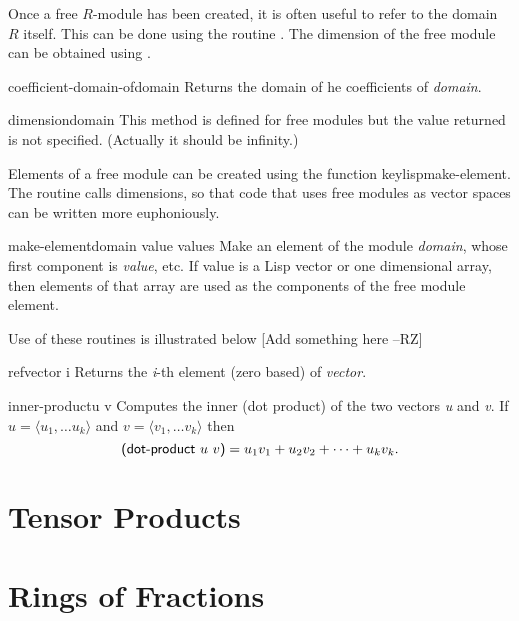 Once a free $R$-module has been created, it is often useful to refer
to the domain $R$ itself. This can be done using the routine
. The dimension of the free module can be
obtained using .
  
\begin{functiondef}{coefficient-domain-of}{domain}
Returns the domain of he coefficients of {\em domain}.
\end{functiondef}

\begin{functiondef}{dimension}{domain}
This method is defined for free modules but the value returned is not
specified. (Actually it should be infinity.)
\end{functiondef}

Elements of a free module can be created using the function
keylisp{make-element}. The routine  calls {\sf
dimensions}, so that code that uses free modules as vector spaces can
be written more euphoniously.
  
\begin{functiondef}{make-element}{domain value \rest values}
Make an element of the module {\em domain}, whose first component is
{\em value}, etc. If value is a Lisp vector or one dimensional array,
then elements of that array are used as the components of the free
module element.
\end{functiondef}  
  
Use of these routines is illustrated below [Add something here --RZ]

  
\begin{functiondef}{ref}{vector i}
Returns the {\em i}-th element (zero based) of {\em vector}.
\end{functiondef}

\begin{functiondef}{inner-product}{u v}
Computes the inner (dot product) of the two vectors {\em u} and {\em
v}. If $u = \langle u_1, \ldots u_k \rangle$ and  $v = \langle v_1,
\ldots v_k \rangle$ then 
\[
\mbox{\sf (dot-product $u$ $v$)} = u_1 v_1 + u_2 v_2 + \cdots + u_k
v_k.
\]  
\end{functiondef}

\section{Tensor Products}
\label{Tensor:Product:Sec}

\section{Rings of Fractions}
\label{Quotient:Field:Sec}

